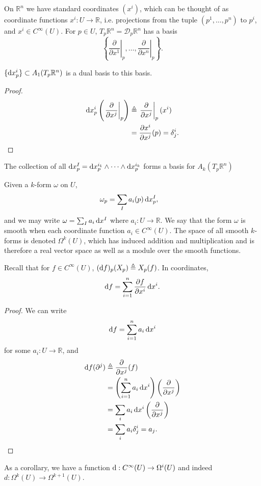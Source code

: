 On $\mathbb{R}^n$ we have standard coordinates $(x^i)$, which can be
thought of as coordinate functions $x^i: U \to \mathbb{R}$,
i.e. projections from the tuple $(p^1, \dots, p^n)$ to $p^i$, and
$x^i \in C^\infty(U)$. For $p \in U$,
$T_p \mathbb{R}^n = \mathcal{D}_p \mathbb{R}^n$ has a basis
$$
\left\{ \left.\frac{\partial}{\partial x^1}\right|_p,
         \dots,
         \left.\frac{\partial}{\partial x^n}\right|_p
\right\}.
$$
\begin{lemma}
$\{\mathop{}\!\mathrm{d} x_p^i\} \subset A_1(T_p \mathbb{R}^n)$ is a dual basis to this basis.
\end{lemma}
\begin{proof}
\begin{align*}
  \mathop{}\!\mathrm{d} x_p^i
    \left(
      \left.\frac{\partial}{\partial x^j}\right|_p
    \right)
&\triangleq
  \left.\frac{\partial}{\partial x^j}\right|_p(x^i) \\
&= \frac{\partial x^i}{\partial x^j}(p)
 = \delta_j^i.
\end{align*}
\end{proof}

\begin{corol}
The collection of all
$\mathop{}\!\mathrm{d} x_p^I = \mathop{}\!\mathrm{d} x_p^{i_1} \wedge \cdots \wedge \mathop{}\!\mathrm{d} x_p^{i_k}$
forms a basis for $A_k(T_p \mathbb{R}^n)$
\end{corol}

\begin{defn}
Given a $k$-form $\omega$ on $U$,
\begin{align*}
   \omega_p
&= \sum_I a_i(p) \mathop{}\!\mathrm{d} x_p^I,
\end{align*}
and we may write $\omega = \sum_I a_i \mathop{}\!\mathrm{d} x^I$ where
$a_i: U \to \mathbb{R}$. We say that the form $\omega$ is smooth when
each coordinate function $a_i \in C^\infty(U)$. The space of all
smooth $k$-forms is denoted $\Omega^k(U)$, which has induced addition
and multiplication and is therefore a real vector space as well as a
module over the smooth functions.
\end{defn}

\begin{prop}
Recall that for $f \in C^\infty(U)$,
$(\mathop{}\!\mathrm{d} f)_p (X_p) \triangleq X_p(f)$. In coordinates,
$$
  \mathop{}\!\mathrm{d} f
= \sum_{i=1}^n \frac{\partial f}{\partial x^i} \mathop{}\!\mathrm{d} x^i.
$$
\end{prop}
\begin{proof}
We can write
$$
  \mathop{}\!\mathrm{d} f
= \sum_{i=1}^n a_i \mathop{}\!\mathrm{d} x^i
$$
for some $a_i : U \to \mathbb{R}$, and
\begin{align*}
   \mathop{}\!\mathrm{d} f (\partial^j)
&\triangleq
   \frac{\partial}{\partial x^j}(f) \\
&= \left(
     \sum_{i=1}^n a_i \mathop{}\!\mathrm{d} x^i
   \right)
   \left(
     \frac{\partial}{\partial x^j}
   \right) \\
&= \sum_i
     a_i \mathop{}\!\mathrm{d} x^i
     \left(
       \frac{\partial}{\partial x^j}
     \right) \\
&= \sum_i a_i \delta_j^i = a_j.
\end{align*}
\end{proof}
As a corollary, we have a function
$\mathop{}\!\mathrm{d} : C^\infty(U) \to \Omega^i(U)$ and indeed
$d: \Omega^k(U) \to \Omega^{k+1}(U)$.


